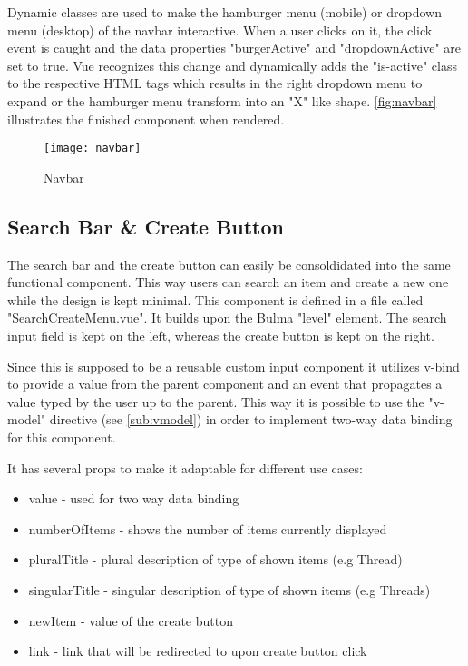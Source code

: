 Dynamic classes are used to make the hamburger menu (mobile) or dropdown menu (desktop) of the navbar interactive. When a user clicks on it, the click event is caught and the data properties "burgerActive" and "dropdownActive" are set to true. Vue recognizes this change and dynamically adds the "is-active" class to the respective HTML tags which results in the right dropdown menu to expand or the hamburger menu transform into an "X" like shape. \autoref{fig:navbar} illustrates the finished component when rendered.

\begin{figure}[H]
  \begin{center}
  \texttt{[image: navbar]}
  \end{center}
  \caption{Navbar}
  \label{fig:navbar}
\end{figure}


\subsection{Search Bar \& Create Button}
The search bar and the create button can easily be consoldidated into the same functional component. This way users can search an item and create a new one while the design is kept minimal. This component is defined in a file called "SearchCreateMenu.vue". It builds upon the Bulma "level" element. The search input field is kept on the left, whereas the create button is kept on the right. 

Since this is supposed to be a reusable custom input component it utilizes v-bind to provide a value from the parent component and an event that propagates a value typed by the user up to the parent. This way it is possible to use the "v-model" directive (see \autoref{sub:vmodel}) in order to implement two-way data binding for this component. 

It has several props to make it adaptable for different use cases:

\begin{itemize}
  \item value - used for two way data binding
  \item numberOfItems - shows the number of items currently displayed
  \item pluralTitle - plural description of type of shown items (e.g Thread)
  \item singularTitle - singular description of type of shown items (e.g Threads)
  \item newItem - value of the create button
  \item link - link that will be redirected to upon create button click
\end{itemize}

